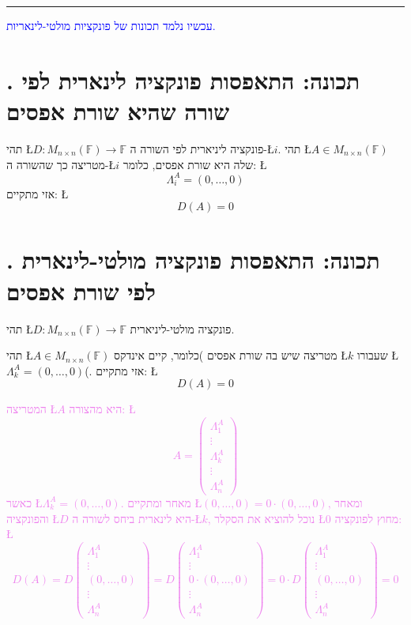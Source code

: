 \documentclass[english,hebrew]{article}
\begin{document}
\medskip{}

\rule[0.5ex]{1\columnwidth}{1pt}

\medskip{}

\textcolor{blue}{עכשיו נלמד תכונות של פונקציות מולטי-לינאריות.}

\section{{\endL}. תכונה: התאפסות פונקציה לינארית לפי שורה שהיא שורת
אפסים}

תהי \L{$D\colon M_{n\times n}(\mathbb{F})\to\mathbb{F}$} פונקציה
ליניארית לפי השורה ה-\L{$i$}. תהי \L{$A\in M_{n\times n}(\mathbb{F})$}
מטריצה כך שהשורה ה-\L{$i$} שלה היא שורת אפסים, כלומר: \L{%
\[
\Lambda_{i}^{A}=(0,\dots,0)
\]
}%
אזי מתקיים: \L{%
\[
D(A)=0
\]
}%

\section{{\endL}. תכונה: התאפסות פונקציה מולטי-לינארית לפי שורת אפסים}

תהי \L{$D\colon M_{n\times n}(\mathbb{F})\to\mathbb{F}$} פונקציה
מולטי-ליניארית.

תהי \L{$A\in M_{n\times n}(\mathbb{F})$} מטריצה שיש בה שורת אפסים
)כלומר, קיים אינדקס \L{$k$} שעבורו \L{$\Lambda_{k}^{A}=(0,\dots,0)$}(.
אזי מתקיים: \L{%
\[
D(A)=0
\]
}%

\medskip{}

\textcolor{violet}{המטריצה \L{$A$} היא מהצורה: \L{%
\[
A=\begin{pmatrix}\Lambda_{1}^{A}\\
\vdots\\
\Lambda_{k}^{A}\\
\vdots\\
\Lambda_{n}^{A}
\end{pmatrix}
\]
}%
כאשר \L{$\Lambda_{k}^{A}=(0,\dots,0)$}. מאחר ומתקיים \L{$(0,\dots,0)=0\cdot(0,\dots,0)$},
ומאחר והפונקציה \L{$D$} היא לינארית ביחס לשורה ה-\L{$k$}, נוכל להוציא
את הסקלר \L{$0$} מחוץ לפונקציה: \L{%
\[
D(A)=D\begin{pmatrix}\Lambda_{1}^{A}\\
\vdots\\
(0,\dots,0)\\
\vdots\\
\Lambda_{n}^{A}
\end{pmatrix}=D\begin{pmatrix}\Lambda_{1}^{A}\\
\vdots\\
0\cdot(0,\dots,0)\\
\vdots\\
\Lambda_{n}^{A}
\end{pmatrix}=0\cdot D\begin{pmatrix}\Lambda_{1}^{A}\\
\vdots\\
(0,\dots,0)\\
\vdots\\
\Lambda_{n}^{A}
\end{pmatrix}=0
\]
}%
}
\end{document}
